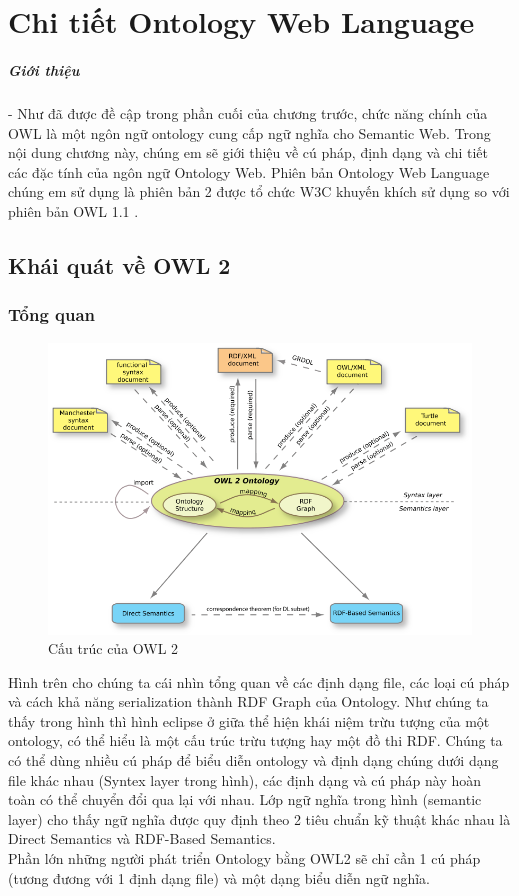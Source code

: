 \chapter{Chi tiết Ontology Web Language}
\paragraph{Giới thiệu } - Như đã được đề cập trong phần cuối của chương trước, chức năng chính của OWL là một ngôn ngữ ontology cung cấp ngữ nghĩa cho Semantic Web. Trong nội dung chương này, chúng em sẽ giới thiệu về cú pháp, định dạng và chi tiết các đặc tính của ngôn ngữ Ontology Web. Phiên bản Ontology Web Language chúng em sử dụng là phiên bản 2 được tổ chức W3C khuyến khích sử dụng so với phiên bản OWL 1.1 .
\section{Khái quát về OWL 2 \cite{owl2}}
\subsection{Tổng quan}
\begin{figure}[ht!]
	\centering
	\includegraphics[width=120mm]{Figures/owl2structure.png}
	\caption{Cấu trúc của OWL 2\label{overflow}}
\end{figure}
Hình trên cho chúng ta cái nhìn tổng quan về các định dạng file, các loại cú pháp và cách khả năng serialization thành RDF Graph của Ontology. Như chúng ta thấy trong hình thì hình eclipse ở giữa thể hiện khái niệm trừu tượng của một ontology, có thể hiểu là một cấu trúc trừu tượng hay một đồ thi RDF. Chúng ta có thể dùng nhiều cú pháp để biểu diễn ontology và định dạng chúng dưới dạng file khác nhau (Syntex layer trong hình), các định dạng và cú pháp này hoàn toàn có thể chuyển đổi qua lại với nhau. Lớp ngữ nghĩa trong hình (semantic layer) cho thấy ngữ nghĩa được quy định theo 2 tiêu chuẩn kỹ thuật khác nhau là Direct Semantics và RDF-Based Semantics.
\\
Phần lớn những người phát triển Ontology bằng OWL2 sẽ chỉ cần 1 cú pháp (tương đương với 1 định dạng file) và một dạng biểu diễn ngữ nghĩa.
